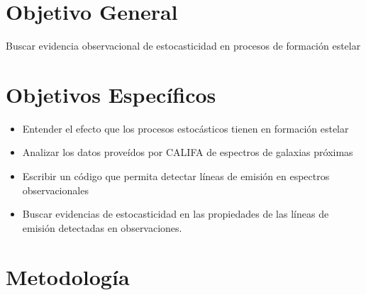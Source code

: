 \documentclass[12pt]{article}
\begin{document}






\section{Objetivo General}

Buscar evidencia observacional de estocasticidad en procesos de
formaci\'on estelar




\section{Objetivos Espec\'ificos}


\begin{itemize}
	\item Entender el efecto que los procesos estoc\'asticos
          tienen en formaci\'on estelar
	\item Analizar los datos prove\'idos por CALIFA de espectros
          de galaxias pr\'oximas
	\item Escribir un c\'odigo que permita detectar l\'ineas de
          emisi\'on en espectros observacionales
	\item Buscar evidencias de estocasticidad en las propiedades
          de las l\'ineas de emisi\'on detectadas en observaciones.
\end{itemize}

\section{Metodolog\'ia}
\end{document}
